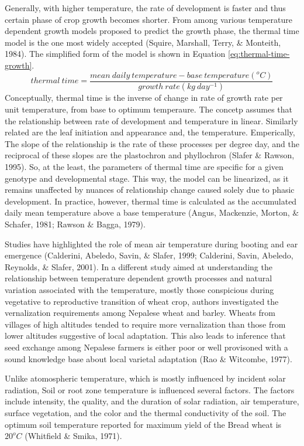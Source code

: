\documentclass[12pt,oneside]{dukestatscithesis} %
\begin{document}
Generally, with higher temperature, the rate of development is faster and thus certain phase of crop growth becomes shorter. From among various temperature dependent growth models proposed to predict the growth phase, the thermal time model is the one most widely accepted (Squire, Marshall, Terry, \& Monteith, 1984). The simplified form of the model is shown in Equation \eqref{eq:thermal-time-growth}.
\begin{equation}
thermal\ time = \frac{mean\ daily\ temperature - base\ temperature(^oC)}{growth\ rate(kg\ day^{-1})}
\label{eq:thermal-time-growth}
\end{equation}
Conceptually, thermal time is the inverse of change in rate of growth rate per unit temperature, from base to optimum temperaure. The concetp assumes that the relationship between rate of development and temperature in linear. Similarly related are the leaf initiation and appearance and, the temperature. Emperically, The slope of the relationship is the rate of these processes per degree day, and the reciprocal of these slopes are the plastochron and phyllochron (Slafer \& Rawson, 1995). So, at the least, the parameters of thermal time are specific for a given genotype and developmental stage. This way, the model can be linearized, as it remains unaffected by nuances of relationship change caused solely due to phasic development. In practice, however, thermal time is calculated as the accumulated daily mean temperature above a base temperature (Angus, Mackenzie, Morton, \& Schafer, 1981; Rawson \& Bagga, 1979).

Studies have highlighted the role of mean air temperature during booting and ear emergence (Calderini, Abeledo, Savin, \& Slafer, 1999; Calderini, Savin, Abeledo, Reynolds, \& Slafer, 2001). In a different study aimed at understanding the relationship between temperature dependent growth processes and natural variation associated with the temperature, mostly those conspicious during vegetative to reproductive transition of wheat crop, authors investigated the vernalization requirements among Nepalese wheat and barley. Wheats from villages of high altitudes tended to require more vernalization than those from lower altitudes suggestive of local adaptation. This also leads to inference that seed exchange among Nepalese farmers is either poor or well provisoned with a sound knowledge base about local varietal adaptation (Rao \& Witcombe, 1977).

Unlike atomospheric temperature, which is mostly influenced by incident solar radiation, Soil or root zone temperature is influenced several factors. The factors include intensity, the quality, and the duration of solar radiation, air temperature, surface vegetation, and the color and the thermal conductivity of the soil. The optimum soil temperature reported for maximum yield of the Bread wheat is \(20^oC\) (Whitfield \& Smika, 1971).
\end{document}
